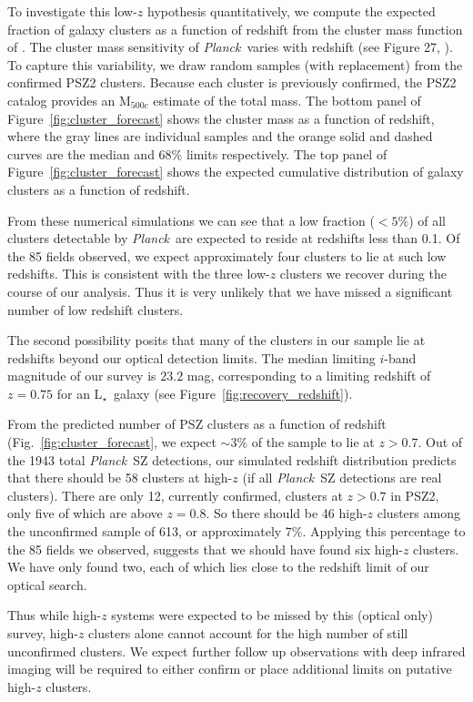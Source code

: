 \documentclass[apj, revtex4-1]{emulateapj}
\newcommand{\planck}{\textit{Planck}}
\newcommand{\sdssi}{\hbox{$i$}}
\newcommand{\lstar}{\hbox{L$_{\star}$}}
\begin{document}
To investigate this low-$z$ hypothesis quantitatively, we compute the expected fraction of galaxy clusters as a function of redshift from the cluster mass function of \cite{Tinker2008}. The cluster mass sensitivity of \planck\ varies with redshift (see Figure 27, \citealt{PlanckCollaboration2015a}). To capture this variability, we draw random samples (with replacement) from the confirmed PSZ2 clusters. Because each cluster is previously confirmed, the PSZ2 catalog provides an M$_{500c}$ estimate of the total mass. The bottom panel of Figure~\ref{fig:cluster_forecast} shows the cluster mass as a function of redshift, where the gray lines are individual samples and the orange solid and dashed curves are the median and 68\% limits respectively. The top panel of Figure~\ref{fig:cluster_forecast} shows the expected cumulative distribution of galaxy clusters as a function of redshift.

From these numerical simulations we can see that a low fraction ($<5\%$) of all clusters detectable by \planck\ are expected to reside at redshifts less than 0.1. Of the 85 fields observed, we expect approximately four clusters to lie at such low redshifts. This is consistent with the three low-$z$ clusters we recover during the course of our analysis. Thus it is very unlikely that we have missed a significant number of low redshift clusters.

The second possibility posits that many  of the clusters in our sample lie at redshifts beyond our optical detection limits. The median limiting \sdssi-band magnitude of our survey is $23.2$ mag, corresponding to a limiting redshift of $z=0.75$ for an \lstar\ galaxy (see Figure~\ref{fig:recovery_redshift}).

From the predicted number of PSZ clusters as a function of redshift (Fig.~\ref{fig:cluster_forecast}, we expect $\sim3\%$ of the sample to lie at $z>0.7$. Out of the 1943 total \planck\ SZ detections, our simulated redshift distribution predicts that there should be 58 clusters at high-$z$ (if all \planck\ SZ detections are real clusters).  There are only 12, currently confirmed, clusters at $z>0.7$ in PSZ2, only five of which are above $z=0.8$. So there should be 46 high-$z$ clusters among the unconfirmed sample of 613, or approximately 7\%. Applying this percentage to the 85 fields we observed, suggests that we should have found six high-$z$ clusters. We have only found two, each of which lies close to the redshift limit of our optical search.

Thus while high-$z$ systems were expected to be missed by this (optical only) survey, high-$z$ clusters alone cannot account for the high number of still unconfirmed clusters. We expect further follow up observations with deep infrared imaging will be required to either confirm or place additional limits on putative high-$z$ clusters.
\end{document}
